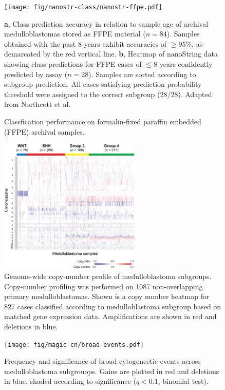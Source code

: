 \documentclass[11pt,letterpaper]{article}
\theoremstyle{definition}
\begin{document}
\begin{figure}[h]
	\begin{center}
		\texttt{[image: fig/nanostr-class/nanostr-ffpe.pdf]}
	\end{center}
	\caption{Classfication performance on formalin-fixed paraffin embedded (FFPE) archival samples.}
	\textbf{a}, Class prediction accuracy in relation to sample age of archival medulloblastomas stored as FFPE material ($n = 84$). Samples obtained with the past 8 years exhibit accuracies of $\geq 95\%$, as demarcated by the red vertical line. \textbf{b}, Heatmap of nanoString data showing class predictions for FFPE cases of $\leq 8$ years confidently predicted by assay ($n = 28$). Samples are sorted according to subgroup prediction. All cases satisfying prediction probability threshold were assigned to the correct subgroup ($28/28$). Adapted from Northcott et al.
	\label{fig:nanostr-ffpe}
\end{figure}

\clearpage

\begin{figure}
	\centering
	\includegraphics[width=0.6\textwidth]{fig/magic-cn/cn-heatmap.png}
	\caption{Genome-wide copy-number profile of medulloblastoma subgroups.
	Copy-number profiling was performed on 1087 non-overlapping primary medulloblastomas. Shown is a copy number heatmap for 827 cases classified according to medulloblastoma subgroup based on matched gene expression data.  Amplifications are shown in red and deletions in blue.}
	\label{fig:cn-heatmap}
\end{figure}

\begin{figure}
	\centering
	\texttt{[image: fig/magic-cn/broad-events.pdf]}
	\caption{Frequency and significance of broad cytogeneetic events across medulloblastoma subgrouops.
	Gains are plotted in red and deletions in blue, shaded according to significance ($q < 0.1$, binomial test).}
	\label{fig:broad-events}
\end{figure} 
\end{document}
